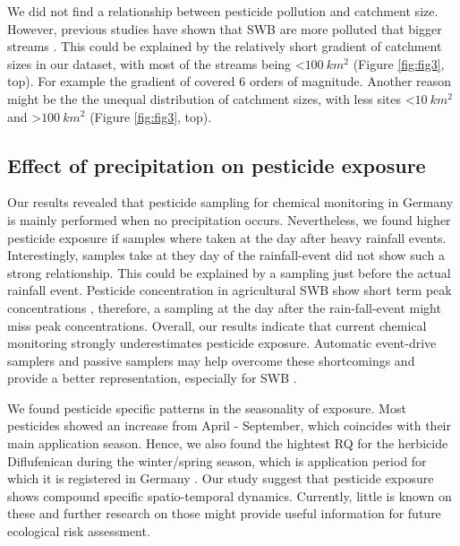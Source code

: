 \documentclass[journal=esthag,manuscript=article]{achemso}
\begin{document}
We did not find a relationship between pesticide pollution and catchment size.
However, previous studies have shown that SWB are more polluted that bigger streams \citep{schulz_field_2004,stehle_pesticide_2015,knauer_pesticides_2016}.
This could be explained by the relatively short gradient of catchment sizes in our dataset, with most of the streams being \textless $100~km^2$ (Figure \ref{fig:fig3}, top).
For example the gradient of \citet{schulz_field_2004} covered 6 orders of magnitude.
Another reason might be the the unequal distribution of catchment sizes, with less sites \textless $10~km^2$ and \textgreater $100~km^2$ (Figure \ref{fig:fig3}, top).



\subsection{Effect of precipitation on pesticide exposure}
Our results revealed that pesticide sampling for chemical monitoring in Germany is mainly performed when no precipitation occurs. 
Nevertheless, we found higher pesticide exposure if samples where taken at the day after heavy rainfall events. 
Interestingly, samples take at they day of the rainfall-event did not show such a strong relationship.
This could be explained by a sampling just before the actual rainfall event.
Pesticide concentration in agricultural SWB show short term peak concentrations \citep{wittmer_significance_2010}, therefore, a sampling at the day after the rain-fall-event might miss peak concentrations.
Overall, our results indicate that current chemical monitoring strongly underestimates pesticide exposure. 
Automatic event-drive samplers \citep{stehle_probabilistic_2013} and passive samplers \citep{fernandez_calibration_2014,moschet_evaluation_2015} may help overcome these shortcomings and provide a better representation, especially for SWB \citep{lorenz_specifics_2016}.

We found pesticide specific patterns in the seasonality of exposure.
Most pesticides showed an increase from April - September, which coincides with their main application season.
Hence, we also found the hightest RQ for the herbicide Diflufenican during the winter/spring season, which is application period for which it is registered in Germany \citep{bvl_online_2016}. 
Our study suggest that pesticide exposure shows compound specific spatio-temporal dynamics.
Currently, little is known on these and further research on those might provide useful information for future ecological risk assessment. 
\end{document}
